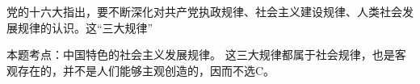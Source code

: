 \question 党的十六大指出，要不断深化对共产党执政规律、社会主义建设规律、人类社会发展规律的认识。这``三大规律''
\par{}
\begin{solution}本题考点：中国特色的社会主义发展规律。
这三大规律都属于社会规律，也是客观存在的，并不是人们能够主观创造的，因而不选C。
\end{solution}
